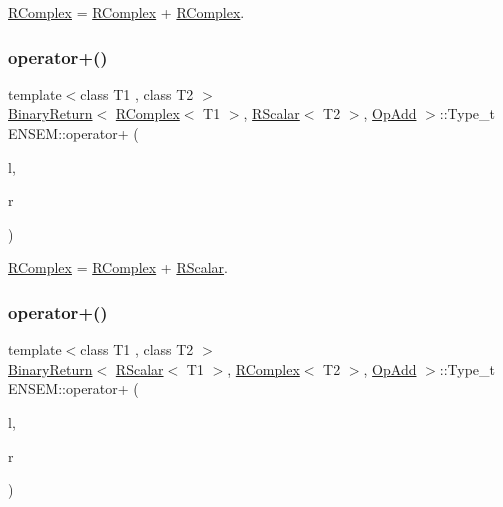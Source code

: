 \mbox{\hyperlink{classENSEM_1_1RComplex}{R\+Complex}} = \mbox{\hyperlink{classENSEM_1_1RComplex}{R\+Complex}} + \mbox{\hyperlink{classENSEM_1_1RComplex}{R\+Complex}}. 

\mbox{\label{group__rcomplex_gacf34d655d02ee81a131842116e13d950}} 
\subsubsection{\texorpdfstring{operator+()}{operator+()}\hspace{0.1cm}{\footnotesize\ttfamily [3/4]}}
{\footnotesize\ttfamily template$<$class T1 , class T2 $>$ \\
\mbox{\hyperlink{structENSEM_1_1BinaryReturn}{Binary\+Return}}$<$ \mbox{\hyperlink{classENSEM_1_1RComplex}{R\+Complex}}$<$ T1 $>$, \mbox{\hyperlink{classENSEM_1_1RScalar}{R\+Scalar}}$<$ T2 $>$, \mbox{\hyperlink{structENSEM_1_1OpAdd}{Op\+Add}} $>$\+::Type\+\_\+t E\+N\+S\+E\+M\+::operator+ (\begin{DoxyParamCaption}\item[{const \mbox{\hyperlink{classENSEM_1_1RComplex}{R\+Complex}}$<$ T1 $>$ \&}]{l,  }\item[{const \mbox{\hyperlink{classENSEM_1_1RScalar}{R\+Scalar}}$<$ T2 $>$ \&}]{r }\end{DoxyParamCaption})\hspace{0.3cm}{\ttfamily [inline]}}



\mbox{\hyperlink{classENSEM_1_1RComplex}{R\+Complex}} = \mbox{\hyperlink{classENSEM_1_1RComplex}{R\+Complex}} + \mbox{\hyperlink{classENSEM_1_1RScalar}{R\+Scalar}}. 

\mbox{\label{group__rcomplex_gad42347a2cdf1648efaec65d4b0f51651}} 
\subsubsection{\texorpdfstring{operator+()}{operator+()}\hspace{0.1cm}{\footnotesize\ttfamily [4/4]}}
{\footnotesize\ttfamily template$<$class T1 , class T2 $>$ \\
\mbox{\hyperlink{structENSEM_1_1BinaryReturn}{Binary\+Return}}$<$ \mbox{\hyperlink{classENSEM_1_1RScalar}{R\+Scalar}}$<$ T1 $>$, \mbox{\hyperlink{classENSEM_1_1RComplex}{R\+Complex}}$<$ T2 $>$, \mbox{\hyperlink{structENSEM_1_1OpAdd}{Op\+Add}} $>$\+::Type\+\_\+t E\+N\+S\+E\+M\+::operator+ (\begin{DoxyParamCaption}\item[{const \mbox{\hyperlink{classENSEM_1_1RScalar}{R\+Scalar}}$<$ T1 $>$ \&}]{l,  }\item[{const \mbox{\hyperlink{classENSEM_1_1RComplex}{R\+Complex}}$<$ T2 $>$ \&}]{r }\end{DoxyParamCaption})\hspace{0.3cm}{\ttfamily [inline]}}



